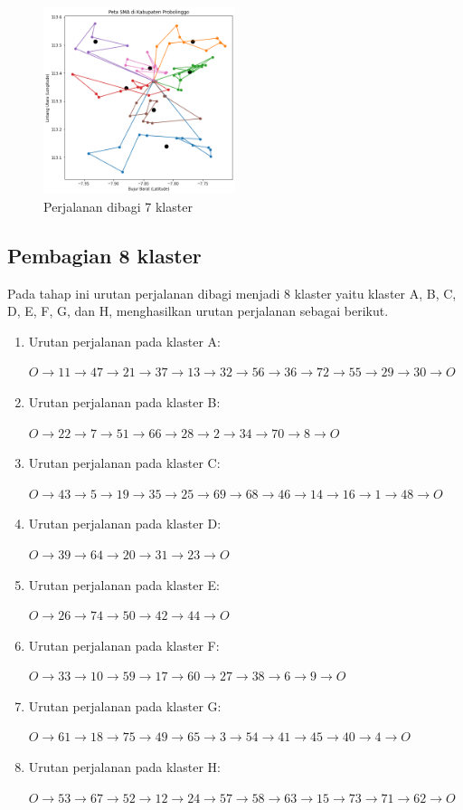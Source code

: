 \begin{figure}[H]
\centering
\includegraphics[width=0.5\textwidth]{Gambar/hasil_mtsp/7}
\caption{Perjalanan dibagi 7 klaster}
\label{fig:hasil_mtsp7}
\end{figure}

\subsection{Pembagian 8 klaster}

Pada tahap ini urutan perjalanan dibagi menjadi 8 klaster yaitu klaster A, B, C, D, E, F, G, dan H, menghasilkan urutan perjalanan sebagai berikut.

\begin{enumerate}
\item Urutan perjalanan pada klaster A:

$O \to 11 \to 47 \to 21 \to 37 \to 13 \to 32 \to 56 \to 36 \to 72 \to 55 \to 29 \to 30 \to O$

\item Urutan perjalanan pada klaster B:

$O \to 22 \to 7 \to 51 \to 66 \to 28 \to 2 \to 34 \to 70 \to 8 \to O$

\item Urutan perjalanan pada klaster C:

$O \to 43 \to 5 \to 19 \to 35 \to 25 \to 69 \to 68 \to 46 \to 14 \to 16 \to 1 \to 48 \to O$

\item Urutan perjalanan pada klaster D:

$O \to 39 \to 64 \to 20 \to 31 \to 23 \to O$

\item Urutan perjalanan pada klaster E:

$O \to 26 \to 74 \to 50 \to 42 \to 44 \to O$

\item Urutan perjalanan pada klaster F:

$O \to 33 \to 10 \to 59 \to 17 \to 60 \to 27 \to 38 \to 6 \to 9 \to O$

\item Urutan perjalanan pada klaster G:

$O \to 61 \to 18 \to 75 \to 49 \to 65 \to 3 \to 54 \to 41 \to 45 \to 40 \to 4 \to O$

\item Urutan perjalanan pada klaster H:

$O \to 53 \to 67 \to 52 \to 12 \to 24 \to 57 \to 58 \to 63 \to 15 \to 73 \to 71 \to 62 \to O$
\end{enumerate}

